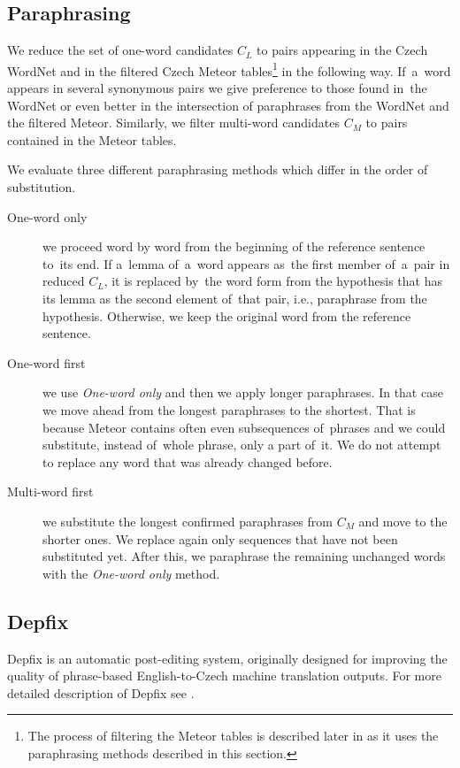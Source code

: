 \subsection{Paraphrasing}
\label{paraphrasing}
We reduce the set of one-word candidates $ C_{L} $ to pairs appearing in the 
Czech WordNet and in the filtered Czech Meteor tables\footnote{The process of 
filtering the Meteor tables is described later in  as it uses
the paraphrasing methods described in this section.} in the following way. 
If~a~word appears in several synonymous pairs we give preference 
to those found in~the WordNet or even better in the intersection of paraphrases 
from the WordNet and the filtered Meteor. Similarly, we filter multi-word 
candidates $ C_{M} $ to pairs contained in the Meteor tables.

We evaluate three different paraphrasing methods which differ in the order of
substitution.

\begin{description}
\item[One-word only] we proceed word by word from the beginning of the 
reference sentence to~its end. If a~lemma of~a~word appears as~the first member 
of~a~pair in reduced $ C_{L} $, it is replaced by~the word form from the 
hypothesis that has its lemma as the second element of~that pair, i.e., 
paraphrase from the hypothesis. Otherwise, we keep the original word from the 
reference sentence.
\item[One-word first] we use \textit{One-word only} and then we apply longer 
paraphrases. In that case we move ahead from the longest paraphrases to the 
shortest. That is because Meteor contains often even subsequences of~phrases 
and we could substitute, instead of~whole phrase, only a part of~it. We do not 
attempt to replace any word that was already changed before.
\item[Multi-word first] we substitute the longest confirmed paraphrases from
$ C_{M} $ and move to the shorter ones. We replace again only sequences that 
have not been substituted yet. After this, we paraphrase the remaining 
unchanged words with the \textit{One-word only} method.
\end{description}

\subsection{Depfix}
\label{depfix}
Depfix is an automatic post-editing system, originally designed for improving 
the quality of phrase-based English-to-Czech machine translation outputs.
For more detailed description of Depfix see .

